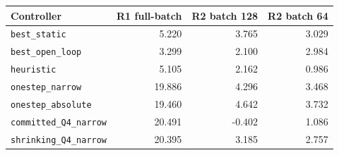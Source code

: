 \begin{tabular}{lrrr}
\toprule
Controller & R1 full-batch & R2 batch 128 & R2 batch 64 \\
\midrule
\texttt{best\_static} & 5.220 & 3.765 & 3.029 \\
\texttt{best\_open\_loop} & 3.299 & 2.100 & 2.984 \\
\texttt{heuristic} & 5.105 & 2.162 & 0.986 \\
\texttt{onestep\_narrow} & 19.886 & 4.296 & 3.468 \\
\texttt{onestep\_absolute} & 19.460 & 4.642 & 3.732 \\
\texttt{committed\_Q4\_narrow} & 20.491 & -0.402 & 1.086 \\
\texttt{shrinking\_Q4\_narrow} & 20.395 & 3.185 & 2.757 \\
\bottomrule
\end{tabular}
